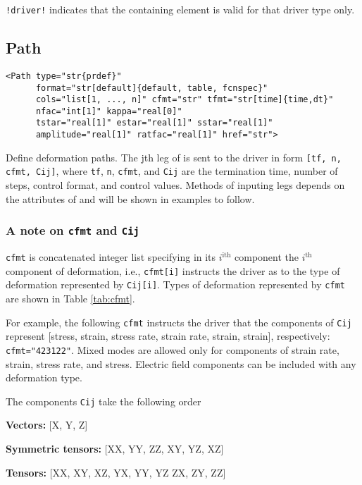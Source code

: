 \documentclass[11pt]{report}
\newcommand{\reqdtag}[1]{\Red{\texttt{<#1>}}}
\newcommand{\supporting}[1]{\texttt{Supporting Drivers: #1}}
\newcommand{\sd}[1]{\texttt{!#1!}}
\begin{document}
\sd{driver} indicates that the containing element is valid for
that driver type only.

\subsection{Path}
\begin{verbatim}
<Path type="str{prdef}"
      format="str[default]{default, table, fcnspec}"
      cols="list[1, ..., n]" cfmt="str" tfmt="str[time]{time,dt}"
      nfac="int[1]" kappa="real[0]"
      tstar="real[1]" estar="real[1]" sstar="real[1]"
      amplitude="real[1]" ratfac="real[1]" href="str">
\end{verbatim}
%
Define deformation paths. The jth leg of \reqdtag{Path} is sent to the driver
in form \texttt{[tf, n, cfmt, Cij]}, where \texttt{tf}, \texttt{n},
\texttt{cfmt}, and \texttt{Cij} are the termination time, number of steps,
control format, and control values.  Methods of inputing legs depends on the
attributes of \reqdtag{Path} and will be shown in examples to follow.

\subsubsection{A note on \texttt{cfmt} and \texttt{Cij}}
\texttt{cfmt} is concatenated integer list specifying in its $i^\text{ith}$
component the $i^\text{th}$ component of deformation, i.e., \texttt{cfmt[i]}
instructs the driver as to the type of deformation represented by
\texttt{Cij[i]}.  Types of deformation represented by \texttt{cfmt} are shown
in Table \ref{tab:cfmt}.

For example, the following \texttt{cfmt} instructs the driver that the
components of \texttt{Cij} represent [stress, strain, stress rate, strain
rate, strain, strain], respectively: \verb:cfmt="423122":. Mixed modes are
allowed only for components of strain rate, strain, stress rate, and stress.
Electric field components can be included with any deformation type.

The components \texttt{Cij} take the following order

\textbf{Vectors:} [X, Y, Z]

\textbf{Symmetric tensors:} [XX, YY, ZZ, XY, YZ, XZ]

\textbf{Tensors:} [XX, XY, XZ, YX, YY, YZ ZX, ZY, ZZ]
\end{document}
